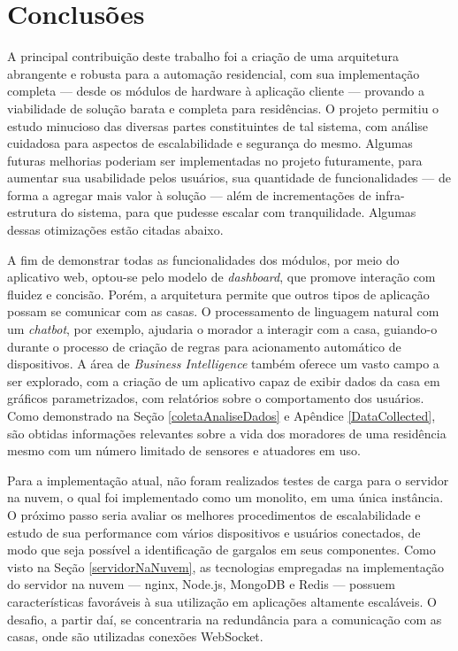 \chapter{Conclusões}

A principal contribuição deste trabalho foi a criação de uma arquitetura abrangente e robusta para a automação residencial, com sua implementação completa --- desde os módulos de hardware à aplicação cliente --- provando a viabilidade de solução barata e completa para residências. O projeto permitiu o estudo minucioso das diversas partes constituintes de tal sistema, com análise cuidadosa para aspectos de escalabilidade e segurança do mesmo. Algumas futuras melhorias poderiam ser implementadas no projeto futuramente, para aumentar sua usabilidade pelos usuários, sua quantidade de funcionalidades --- de forma a agregar mais valor à solução --- além de incrementações de infra-estrutura do sistema, para que pudesse escalar com tranquilidade. Algumas dessas otimizações estão citadas abaixo.

A fim de demonstrar todas as funcionalidades dos módulos, por meio do aplicativo web, optou-se pelo modelo de \textit{dashboard}, que promove interação com fluidez e concisão. Porém, a arquitetura permite que outros tipos de aplicação possam se comunicar com as casas. O processamento de linguagem natural com um \textit{chatbot}, por exemplo, ajudaria o morador a interagir com a casa, guiando-o durante o processo de criação de regras para acionamento automático de dispositivos. A área de \textit{Business Intelligence} também oferece um vasto campo a ser explorado, com a criação de um aplicativo capaz de exibir dados da casa em gráficos parametrizados, com relatórios sobre o comportamento dos usuários. Como demonstrado na Seção \ref{coletaAnaliseDados} e Apêndice \ref{DataCollected}, são obtidas informações relevantes sobre a vida dos moradores de uma residência mesmo com um número limitado de sensores e atuadores em uso.

Para a implementação atual, não foram realizados testes de carga para o servidor na nuvem, o qual foi implementado como um monolito, em uma única instância. O próximo passo seria avaliar os melhores procedimentos de escalabilidade e estudo de sua performance com vários dispositivos e usuários conectados, de modo que seja possível a identificação de gargalos em seus componentes. Como visto na Seção \ref{servidorNaNuvem}, as tecnologias empregadas na implementação do servidor na nuvem --- nginx, Node.js, MongoDB e Redis --- possuem características favoráveis à sua utilização em aplicações altamente escaláveis.  O desafio, a partir daí, se concentraria na redundância para a comunicação com as casas, onde são utilizadas conexões WebSocket.

